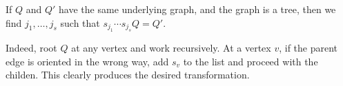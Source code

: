 If $Q$ and $Q'$ have the same underlying graph, and the graph is a tree, then
we find $j_1, \ldots, j_s$ such that $s_{j_1}\cdots s_{j_s}Q  = Q'$.

Indeed, root $Q$ at any vertex and work recursively. At a vertex $v$, if the
parent edge is oriented in the wrong way, add $s_v$ to the list and proceed with
the childen. This clearly produces the desired transformation.
